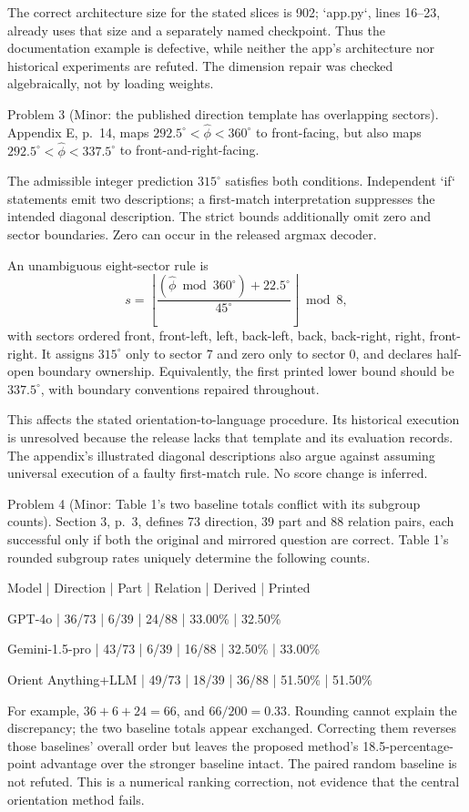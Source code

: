 \documentclass[10pt]{article}
\begin{document}
The correct architecture size for the stated slices is 902; `app.py`, lines 16–23, already uses that size and a separately named checkpoint. Thus the documentation example is defective, while neither the app’s architecture nor historical experiments are refuted. The dimension repair was checked algebraically, not by loading weights.\par
Problem 3 (Minor: the published direction template has overlapping sectors).  Appendix E, p. 14, maps \(292.5^\circ<\hat\phi<360^\circ\) to front-facing, but also maps \(292.5^\circ<\hat\phi<337.5^\circ\) to front-and-right-facing.\par
The admissible integer prediction \(315^\circ\) satisfies both conditions. Independent `if` statements emit two descriptions; a first-match interpretation suppresses the intended diagonal description. The strict bounds additionally omit zero and sector boundaries. Zero can occur in the released argmax decoder.\par
An unambiguous eight-sector rule is \[s=\left\lfloor\frac{(\hat\phi\bmod360^\circ)+22.5^\circ}{45^\circ}
\right\rfloor\bmod8,\] with sectors ordered front, front-left, left, back-left, back, back-right, right, front-right. It assigns \(315^\circ\) only to sector 7 and zero only to sector 0, and declares half-open boundary ownership. Equivalently, the first printed lower bound should be \(337.5^\circ\), with boundary conventions repaired throughout.\par
This affects the stated orientation-to-language procedure. Its historical execution is unresolved because the release lacks that template and its evaluation records. The appendix’s illustrated diagonal descriptions also argue against assuming universal execution of a faulty first-match rule. No score change is inferred.\par
Problem 4 (Minor: Table 1’s two baseline totals conflict with its subgroup counts).  Section 3, p. 3, defines 73 direction, 39 part and 88 relation pairs, each successful only if both the original and mirrored question are correct. Table 1’s rounded subgroup rates uniquely determine the following counts.\par
Model | Direction | Part | Relation | Derived | Printed\par
GPT-4o | 36/73 | 6/39 | 24/88 | 33.00\% | 32.50\%\par
Gemini-1.5-pro | 43/73 | 6/39 | 16/88 | 32.50\% | 33.00\%\par
Orient Anything+LLM | 49/73 | 18/39 | 36/88 | 51.50\% | 51.50\%\par
For example, \(36+6+24=66\), and \(66/200=0.33\). Rounding cannot explain the discrepancy; the two baseline totals appear exchanged. Correcting them reverses those baselines’ overall order but leaves the proposed method’s 18.5-percentage-point advantage over the stronger baseline intact. The paired random baseline is not refuted. This is a numerical ranking correction, not evidence that the central orientation method fails.\par
\end{document}
